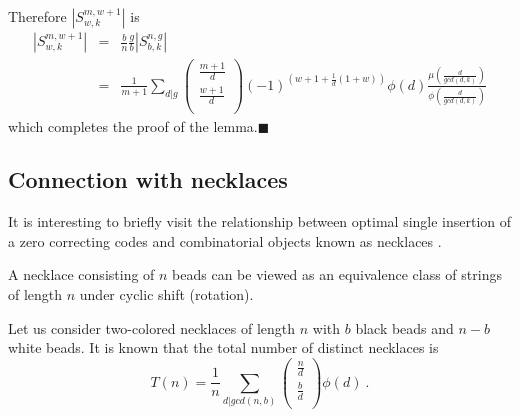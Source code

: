 Therefore $|S_{w,k}^{m,w+1}|$ is
\begin{equation}\begin{array}{lll}
|S_{w,k}^{m,w+1}|&=& \frac{b}{n} \frac{g}{b} |S_{b,k}^{n,g}|\\
{}&=&\frac{1}{m+1}\sum_{d|g} \left(
\begin{array}{c}
                             \frac{m+1}{d} \\
                             \frac{w+1}{d} \\
                           \end{array} \right)(-1)^{(w+1+\frac{1}{d}(1+w))}\phi(d) \frac{\mu\left(\frac{d}{gcd(d,k)}\right)}{\phi\left(\frac{d}{gcd(d,k)}\right)}
\end{array}\end{equation} which completes the proof of the
lemma.\hfill$\blacksquare$

\subsection{Connection with necklaces}

It is interesting to briefly visit the relationship between optimal
single insertion of a zero correcting codes and combinatorial
objects known as necklaces \cite{GR61}.

A necklace consisting of $n$ beads can be viewed as an equivalence
class of strings of length $n$ under cyclic shift (rotation).

Let us consider two-colored necklaces of length $n$ with $b$ black
beads and $n-b$ white beads. It is known that the total number of
distinct necklaces is~\cite{GR61}
\begin{equation}
T(n)=\frac{1}{n} \sum_{d|gcd(n,b)} \left( \begin{array}{c}
                             \frac{n}{d} \\
                             \frac{b}{d} \\
                           \end{array} \right)\phi(d)~.
\end{equation}

